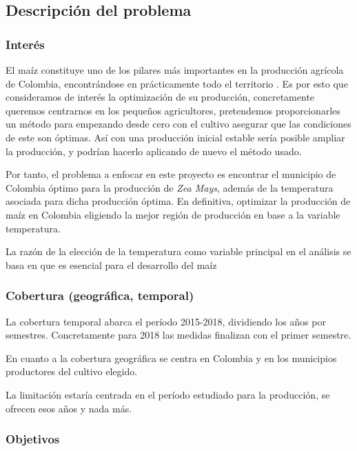 \documentclass[12pt, spanish]{article}
\begin{document}
\subsection{Descripción del problema}

\subsubsection{Interés}

El maíz constituye uno de los pilares más importantes en la producción agrícola de Colombia, encontrándose en prácticamente todo el territorio \cite{ref5}. 
Es por esto que consideramos de interés la optimización de su producción, concretamente queremos centrarnos en los pequeños agricultores, pretendemos proporcionarles un método para empezando desde cero con el cultivo asegurar que las condiciones de este son óptimas. Así con una producción inicial estable sería posible ampliar la producción, y podrían hacerlo aplicando de nuevo el método usado.

Por tanto, el problema a enfocar en este proyecto es encontrar el municipio de Colombia óptimo para la producción de \textit{Zea Mays}, además de la temperatura asociada para dicha producción óptima. En definitiva, optimizar la producción de maíz en Colombia eligiendo la mejor región de producción en base a la variable temperatura.

La razón de la elección de la temperatura como variable principal en el análisis se basa en que es esencial para el desarrollo del maíz \cite{ref10}


\subsubsection{Cobertura (geográfica, temporal)}

La cobertura temporal abarca el período 2015-2018, dividiendo los años por   semestres. Concretamente para 2018 las medidas finalizan con el primer semestre.

En cuanto a la cobertura geográfica se centra en Colombia y en los municipios productores del cultivo elegido.

La limitación estaría centrada en el período estudiado para la producción, se ofrecen esos años y nada más.

\subsubsection{Objetivos}
\end{document}
